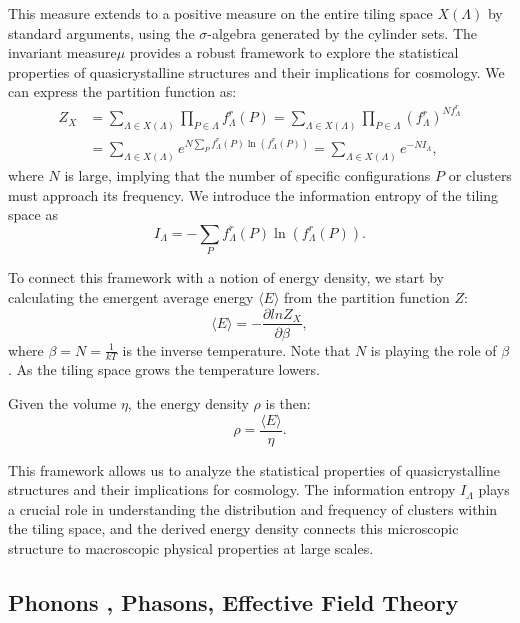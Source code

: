 \documentclass[sn-mathphys-num]{sn-jnl}%
\begin{document}
This measure extends to a positive measure on the entire tiling space $X(\varLambda)$ by standard arguments, using the \(\sigma\)-algebra generated by the cylinder sets.  
The invariant measure$\mu$ provides a robust framework to explore the statistical properties of quasicrystalline structures and their implications for cosmology. We can express the partition function as: 
\begin{align}
Z_{X} & =\sum_{\varLambda\in X(\varLambda)}\prod_{P\in\varLambda}f_{\varLambda}^{r}(P)=\sum_{\varLambda\in X(\varLambda)}\prod_{P\in\varLambda}\left(f_{\varLambda}^{r}\right)^{Nf_{\varLambda}^{r}}\nonumber \\
 & =\sum_{\varLambda\in X(\varLambda)}e^{N\sum_{P}f_{\varLambda}^{r}(P)\ln(f_{\varLambda}^{r}(P))}=\sum_{\varLambda\in X(\varLambda)}e^{-NI_{\varLambda}},
\end{align}
where $N$ is large, implying that the number of specific configurations
$P$ or clusters must approach its frequency. We introduce the information
entropy of the tiling space as 
\begin{equation}
I_{\varLambda}=-\sum_{P}f_{\varLambda}^{r}(P)\ln(f_{\varLambda}^{r}(P)).
\end{equation}

To connect this framework with a notion of energy density, we start
by calculating the emergent average energy $\langle E\rangle$ from
the partition function $Z$: 
\begin{equation}
\langle E\rangle=-\frac{\partial lnZ_{X}}{\partial\beta},
\end{equation}
where $\beta=N=\frac{1}{kT}$ is the inverse temperature. Note that
$N$ is playing the role of $\beta$. As the tiling space grows the
temperature lowers.

Given the volume $\eta$, the energy density $\rho$ is then: 
\begin{equation}
\rho=\frac{\langle E\rangle}{\eta}.
\end{equation}

This framework allows us to analyze the statistical properties of quasicrystalline structures and their implications for cosmology. The information entropy $I_{\varLambda}$ plays a crucial role in understanding the distribution and frequency of clusters within the tiling space, and the derived energy density connects this microscopic structure to macroscopic physical properties at large scales. 

\subsection{Phonons , Phasons, Effective Field Theory}
\end{document}

